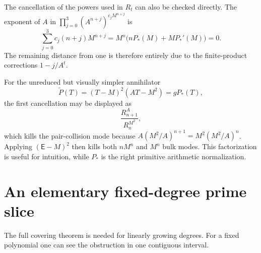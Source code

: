 \documentclass[11pt,oneside]{article}
\theoremstyle{definition}
\theoremstyle{remark}
\newcommand{\EF}{\mathsf E}
\begin{document}
The cancellation of the powers used in $R_t$ can also be checked directly.  The exponent of
$A$ in
$\prod_{j=0}^3(A^{n+j})^{c_jM^{n+j}}$ is
\begin{equation}
 \sum_{j=0}^3c_j(n+j)M^{n+j}
 =M^n\bigl(nP_*(M)+MP_*'(M)\bigr)=0.
 \label{eq:canonical-A-cancel}
\end{equation}
The remaining distance from one is therefore entirely due to the finite-product corrections
$1-j/A^t$.

For the unreduced but visually simpler annihilator
\begin{equation}
 \widetilde P(T)=(T-M)^2(AT-M^2)=gP_*(T),
 \label{eq:Ptilde}
\end{equation}
the first cancellation may be displayed as
\begin{equation}
 \frac{R_{n+1}^{A}}{R_n^{M^2}},
 \label{eq:first-cancel}
\end{equation}
which kills the pair-collision mode because
$A(M^2/A)^{n+1}=M^2(M^2/A)^n$.  Applying $(\EF-M)^2$ then kills both
$nM^n$ and $M^n$ bulk modes.  This factorization is useful for intuition, while $P_*$ is the
right primitive arithmetic normalization.

\section{An elementary fixed-degree prime slice}
\label{app:fixed-slice}

The full covering theorem is needed for linearly growing degrees.  For a fixed polynomial one
can see the obstruction in one contiguous interval.
\end{document}
